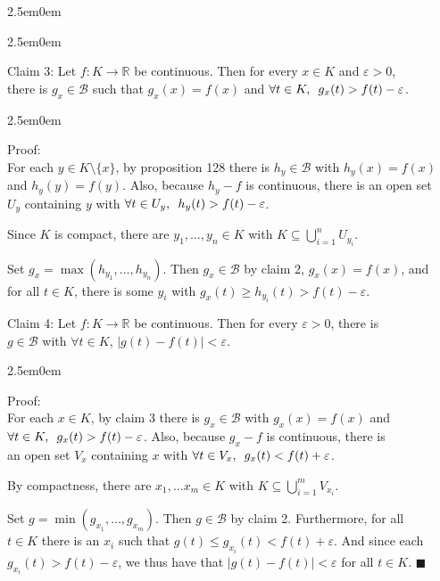 \documentclass{book}
\newcommand{\hFour}{%
   \color{Cerulean}
   \fontsize{12}{14}\selectfont%
}
\newenvironment{myIndent}{%
   \begin{adjustwidth}{2.5em}{0em}%
}{%
   \end{adjustwidth}%
}
\newcommand{\myHS}{ \hspace{0.5em}}
\newcommand{\retTwo}{\hfill\bigbreak}
\begin{document}
{\begin{myIndent}
{\begin{myIndent}
      Claim 3: Let $f: K \longrightarrow \mathbb{R}$ be continuous. Then for every $x \in K$ and $\varepsilon > 0$,\\ there is $g_x \in \mathscr{B}$ such that $g_x(x) = f(x)$ and $\forall t \in K,\myHS g_x(t) > f(t) - \varepsilon$.

      {\begin{myIndent}\hFour
         Proof:\\
         For each $y \in K \setminus \{x\}$, by proposition 128 there is $h_y \in \mathscr{B}$ with $h_y(x) = f(x)$\\ and $h_y(y) = f(y)$. Also, because $h_y - f$ is continuous, there is an open set\\ $U_y$ containing $y$ with $\forall t \in U_y, \myHS h_y(t) > f(t) - \varepsilon$.\retTwo

         Since $K$ is compact, there are $y_1, \ldots, y_n \in K$ with $K \subseteq \bigcup\limits_{i=1}^n U_{y_i}$.\retTwo

         Set $g_x = \max(h_{y_1}, \ldots, h_{y_n})$. Then $g_x \in \mathscr{B}$ by claim 2, $g_x(x) = f(x)$, and\\ for all $t \in K$, there is some $y_i$ with $g_x(t) \geq h_{y_i}(t) > f(t) - \varepsilon$.\retTwo
      \end{myIndent}}

      Claim 4: Let $f: K \longrightarrow \mathbb{R}$ be continuous. Then for every $\varepsilon > 0$, there is\\ $g \in \mathscr{B}$ with $\forall t \in K$, $|g(t) - f(t)| < \varepsilon$.

      {\begin{myIndent}\hFour
         Proof:\\
         For each $x \in K$, by claim 3 there is $g_x \in \mathscr{B}$ with $g_x(x) = f(x)$ and\\ $\forall t \in K,\myHS g_x(t) > f(t) - \varepsilon$. Also, because $g_x - f$ is continuous, there is\\ an open set $V_x$ containing $x$ with $\forall t \in V_x,\myHS g_x(t) < f(t) + \varepsilon$.\retTwo

         By compactness, there are $x_1, \ldots x_m \in K$ with $K \subseteq \bigcup\limits_{i=1}^m V_{x_i}$.\retTwo

         Set $g = \min(g_{x_1}, \ldots, g_{x_m})$. Then $g \in \mathscr{B}$ by claim 2. Furthermore, for all\\ $t \in K$ there is an $x_i$ such that $g(t) \leq g_{x_i}(t) < f(t) + \varepsilon$. And since  each\\ $g_{x_i}(t) > f(t) - \varepsilon$, we thus have that $|g(t) - f(t)| < \varepsilon$ for all $t\in K$. $\blacksquare$
      \end{myIndent}}
   \end{myIndent}}
\end{myIndent}}
\end{document}
